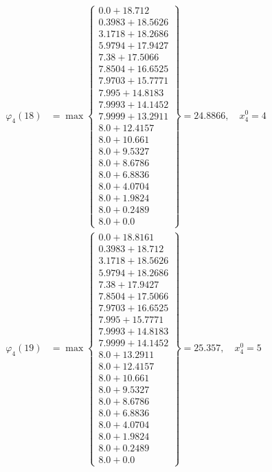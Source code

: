 \documentclass{article}
\begin{document}
\begin{align*}
\varphi_{4}(18) &= \max \left\{ \begin{array}{c}
0.0 + 18.712 \\
 0.3983 + 18.5626 \\
 3.1718 + 18.2686 \\
 5.9794 + 17.9427 \\
 7.38 + 17.5066 \\
 7.8504 + 16.6525 \\
 7.9703 + 15.7771 \\
 7.995 + 14.8183 \\
 7.9993 + 14.1452 \\
 7.9999 + 13.2911 \\
 8.0 + 12.4157 \\
 8.0 + 10.661 \\
 8.0 + 9.5327 \\
 8.0 + 8.6786 \\
 8.0 + 6.8836 \\
 8.0 + 4.0704 \\
 8.0 + 1.9824 \\
 8.0 + 0.2489 \\
 8.0 + 0.0
\end{array} \right\}=24.8866, \quad x_{4}^0=4\\
  
\varphi_{4}(19) &= \max \left\{ \begin{array}{c}
0.0 + 18.8161 \\
 0.3983 + 18.712 \\
 3.1718 + 18.5626 \\
 5.9794 + 18.2686 \\
 7.38 + 17.9427 \\
 7.8504 + 17.5066 \\
 7.9703 + 16.6525 \\
 7.995 + 15.7771 \\
 7.9993 + 14.8183 \\
 7.9999 + 14.1452 \\
 8.0 + 13.2911 \\
 8.0 + 12.4157 \\
 8.0 + 10.661 \\
 8.0 + 9.5327 \\
 8.0 + 8.6786 \\
 8.0 + 6.8836 \\
 8.0 + 4.0704 \\
 8.0 + 1.9824 \\
 8.0 + 0.2489 \\
 8.0 + 0.0
\end{array} \right\}=25.357, \quad x_{4}^0=5\\
  

\end{align*}
\end{document}
